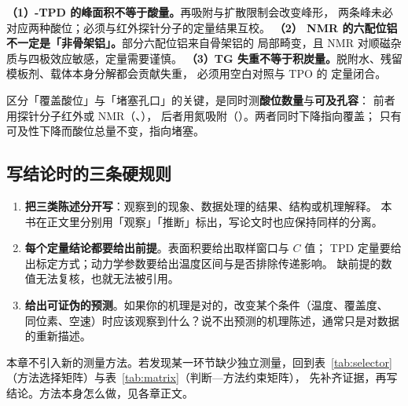 \begin{pitfall}
\textbf{（1）-TPD 的峰面积不等于酸量。}再吸附与扩散限制会改变峰形，
两条峰未必对应两种酸位；必须与红外探针分子的定量结果互校。
\textbf{（2） NMR 的六配位铝不一定是「非骨架铝」。}部分六配位铝来自骨架铝的
局部畸变，且 NMR 对顺磁杂质与四极效应敏感，定量需要谨慎。
\textbf{（3）TG 失重不等于积炭量。}脱附水、残留模板剂、载体本身分解都会贡献失重，
必须用空白对照与 TPO 的  定量闭合。
\end{pitfall}

\begin{crosscheck}
区分「覆盖酸位」与「堵塞孔口」的关键，是同时测\textbf{酸位数量}与\textbf{可及孔容}：
前者用探针分子红外或  NMR（、），
后者用氮吸附（）。两者同时下降指向覆盖；
只有可及性下降而酸位总量不变，指向堵塞。
\end{crosscheck}

\subsection{写结论时的三条硬规则}

\begin{enumerate}
\item \textbf{把三类陈述分开写}：观察到的现象、数据处理的结果、结构或机理解释。
本书在正文里分别用「观察」「推断」标出，写论文时也应保持同样的分离。
\item \textbf{每个定量结论都要给出前提}。表面积要给出取样窗口与 $C$ 值；
TPD 定量要给出标定方式；动力学参数要给出温度区间与是否排除传递影响。
缺前提的数值无法复核，也就无法被引用。
\item \textbf{给出可证伪的预测}。如果你的机理是对的，改变某个条件（温度、覆盖度、
同位素、空速）时应该观察到什么？说不出预测的机理陈述，通常只是对数据的重新描述。
\end{enumerate}

\begin{crosscheck}
本章不引入新的测量方法。若发现某一环节缺少独立测量，回到表~\ref{tab:selector}
（方法选择矩阵）与表~\ref{tab:matrix}（判断—方法约束矩阵），
先补齐证据，再写结论。方法本身怎么做，见各章正文。
\end{crosscheck}
